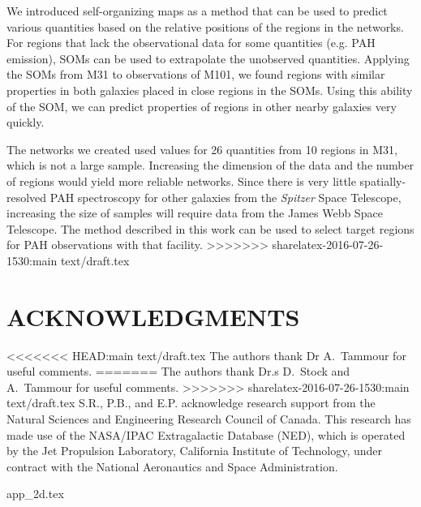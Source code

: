 \documentclass[useAMS,usenatbib]{mn2e}
\newcommand \Spitzer {{\it Spitzer }}
\begin{document}
We introduced self-organizing maps as a method that can be used to predict various quantities based on the relative positions of the regions in the networks.
For regions that lack the observational data for some quantities (e.g. PAH emission), SOMs can be used to extrapolate the unobserved quantities.
Applying the SOMs from M31 to observations of M101, we found regions with similar properties in both galaxies placed in close regions in the SOMs.
Using this ability of the SOM, we can predict properties of regions in other nearby galaxies very quickly.

The networks we created used values for 26 quantities from 10 regions in M31, which is not a large sample.
Increasing the dimension of the data and the number of regions would yield more reliable networks.
Since there is very little spatially-resolved PAH spectroscopy for other galaxies from the \Spitzer Space Telescope, increasing the size of samples will require data from the James Webb Space Telescope.
The method described in this work can be used to select target regions for PAH observations with that facility. 
>>>>>>> sharelatex-2016-07-26-1530:main text/draft.tex

 

\section*{ACKNOWLEDGMENTS}
<<<<<<< HEAD:main text/draft.tex
The authors thank Dr A.\ Tammour for useful comments. 
=======
The authors thank Dr.s D.\ Stock and A.\ Tammour for useful comments. 
>>>>>>> sharelatex-2016-07-26-1530:main text/draft.tex
S.R., P.B., and E.P. acknowledge research support from the Natural Sciences and Engineering Research Council of Canada. This research has made use of the NASA/IPAC Extragalactic Database (NED), which is operated by the Jet Propulsion Laboratory, California Institute of Technology, under contract with the National Aeronautics and Space Administration.


{app_2d.tex}
\end{document}
